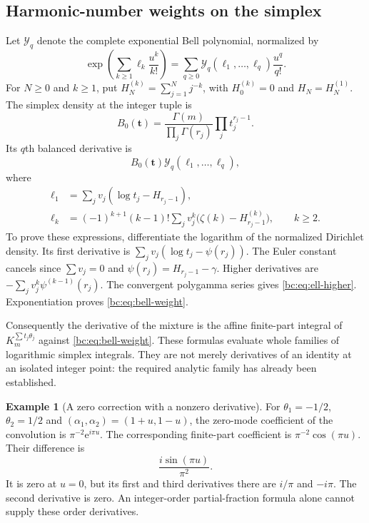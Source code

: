 \documentclass[11pt,letterpaper]{article}
\numberwithin{equation}{section}
\theoremstyle{definition}
\newtheorem{example}[theorem]{Example}
\theoremstyle{remark}
\newcommand{\bcY}{\mathcal Y}
\newcommand{\bce}{\mathrm e}
\begin{document}
\subsection{Harmonic-number weights on the simplex}

Let $\bcY_q$ denote the complete exponential Bell polynomial, normalized by
\[
 \exp\left(\sum_{k\ge1}\ell_k\frac{u^k}{k!}\right)
          =\sum_{q\ge0}\bcY_q(\ell_1,\ldots,\ell_q)\frac{u^q}{q!}.
\]
For $N\ge0$ and $k\ge1$, put
$H_N^{(k)}=\sum_{j=1}^N j^{-k}$, with $H_0^{(k)}=0$ and $H_N=H_N^{(1)}$.
The simplex density at the integer tuple is
\[
 B_0(\bm t)=\frac{\Gamma(m)}{\prod_j\Gamma(r_j)}
                             \prod_jt_j^{r_j-1}.
\]
Its $q$th balanced derivative is
\begin{equation}\label{bc:eq:bell-weight}
 B_0(\bm t)\bcY_q(\ell_1,\ldots,\ell_q),
\end{equation}
where
\begin{align}
 \ell_1&=\sum_jv_j(\log t_j-H_{r_j-1}),
       \label{bc:eq:ell-one}\\
 \ell_k&=(-1)^{k+1}(k-1)!
           \sum_jv_j^k\bigl(\zeta(k)-H_{r_j-1}^{(k)}\bigr),
                      \qquad k\ge2.
       \label{bc:eq:ell-higher}
\end{align}
To prove these expressions, differentiate the logarithm of the normalized
Dirichlet density. Its first derivative is
$\sum_jv_j(\log t_j-\psi(r_j))$. The Euler constant cancels since
$\sum v_j=0$ and $\psi(r_j)=H_{r_j-1}-\gamma$. Higher derivatives are
$-\sum_jv_j^k\psi^{(k-1)}(r_j)$. The convergent polygamma series gives
\eqref{bc:eq:ell-higher}. Exponentiation proves
\eqref{bc:eq:bell-weight}.

Consequently the derivative of the mixture is the affine finite-part
integral of $K_m^{\sum t_j\theta_j}$ against
\eqref{bc:eq:bell-weight}. These formulas evaluate whole families of
logarithmic simplex integrals. They are not merely derivatives of an
identity at an isolated integer point: the required analytic family has
already been established.

\begin{example}[A zero correction with a nonzero derivative]
For $\theta_1=-1/2$, $\theta_2=1/2$ and
$(\alpha_1,\alpha_2)=(1+u,1-u)$, the zero-mode coefficient of the
convolution is $\pi^{-2}\bce^{i\pi u}$. The corresponding finite-part
coefficient is $\pi^{-2}\cos(\pi u)$. Their difference is
\begin{equation}\label{bc:eq:jet-example}
 \frac{i\sin(\pi u)}{\pi^2}.
\end{equation}
It is zero at $u=0$, but its first and third derivatives there are
$i/\pi$ and $-i\pi$. The second derivative is zero. An integer-order
partial-fraction formula alone cannot supply these order derivatives.
\end{example}
\end{document}
